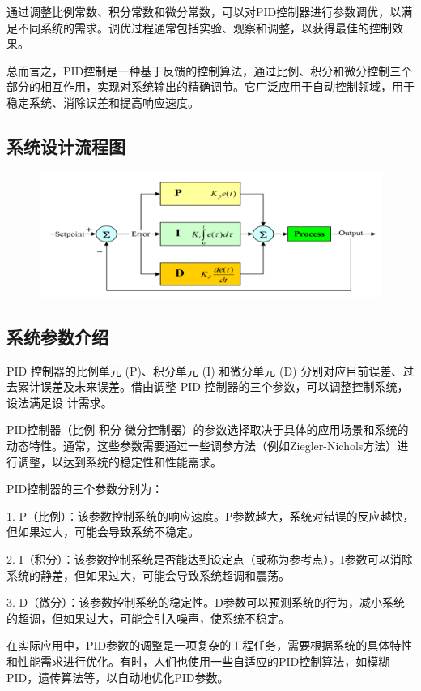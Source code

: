 \documentclass{thuemp}
\begin{document}
通过调整比例常数、积分常数和微分常数，可以对PID控制器进行参数调优，以满足不同系统的需求。调优过程通常包括实验、观察和调整，以获得最佳的控制效果。

总而言之，PID控制是一种基于反馈的控制算法，通过比例、积分和微分控制三个部分的相互作用，实现对系统输出的精确调节。它广泛应用于自动控制领域，用于稳定系统、消除误差和提高响应速度。

\subsection{系统设计流程图}
\begin{figure}[H]
\centering
\includegraphics[width=1\linewidth]{./img/from_internet/PID.png}
\end{figure}

\subsection{系统参数介绍}

PID 控制器的比例单元 (P)、积分单元 (I) 和微分单元 (D) 分别对应目前误差、过去累计误差及未来误差。借由调整 PID 控制器的三个参数，可以调整控制系统，设法满足设
计需求。

PID控制器（比例-积分-微分控制器）的参数选择取决于具体的应用场景和系统的动态特性。通常，这些参数需要通过一些调参方法（例如Ziegler-Nichols方法）进行调整，以达到系统的稳定性和性能需求。

PID控制器的三个参数分别为：

1. P（比例）：该参数控制系统的响应速度。P参数越大，系统对错误的反应越快，但如果过大，可能会导致系统不稳定。

2. I（积分）：该参数控制系统是否能达到设定点（或称为参考点）。I参数可以消除系统的静差，但如果过大，可能会导致系统超调和震荡。

3. D（微分）：该参数控制系统的稳定性。D参数可以预测系统的行为，减小系统的超调，但如果过大，可能会引入噪声，使系统不稳定。

在实际应用中，PID参数的调整是一项复杂的工程任务，需要根据系统的具体特性和性能需求进行优化。有时，人们也使用一些自适应的PID控制算法，如模糊PID，遗传算法等，以自动地优化PID参数。
\end{document}
